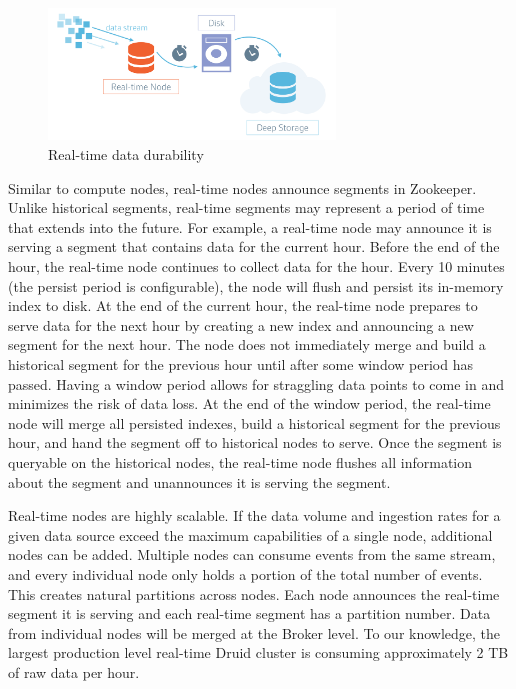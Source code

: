 \documentclass{vldb}
\begin{document}
\begin{figure}
\centering
\includegraphics[width = 3in]{druid_realtime_flow}
\caption{Real-time data durability}
\label{fig:data-durability}
\end{figure}

Similar to compute nodes, real-time nodes announce segments in Zookeeper. Unlike historical segments, real-time segments may represent a period of time that extends into the future. For example, a real-time node may announce it is serving a segment that contains data for the current hour. Before the end of the hour, the real-time node continues to collect data for the hour. Every 10 minutes (the persist period is configurable), the node will flush and persist its in-memory index to disk. At the end of the current hour, the real-time node prepares to serve data for the next hour by creating a new index and announcing a new segment for the next hour. The node does not immediately merge and build a historical segment for the previous hour until after some window period has passed. Having a window period allows for straggling data points to come in and minimizes the risk of data loss. At the end of the window period, the real-time node will merge all persisted indexes, build a historical segment for the previous hour, and hand the segment off to historical nodes to serve. Once the segment is queryable on the historical nodes, the real-time node flushes all information about the segment and unannounces it is serving the segment.

Real-time nodes are highly scalable. If the data volume and ingestion rates for a given data source exceed the maximum capabilities of a single node, additional nodes can be added.  Multiple nodes can consume events from the same stream, and every individual node only holds a portion of the total number of events.  This creates natural partitions across nodes. Each node announces the real-time segment it is serving and each real-time segment has a partition number.  Data from individual nodes will be merged at the Broker level.  To our knowledge, the largest production level real-time Druid cluster is consuming approximately 2 TB of raw data per hour.
\end{document}
